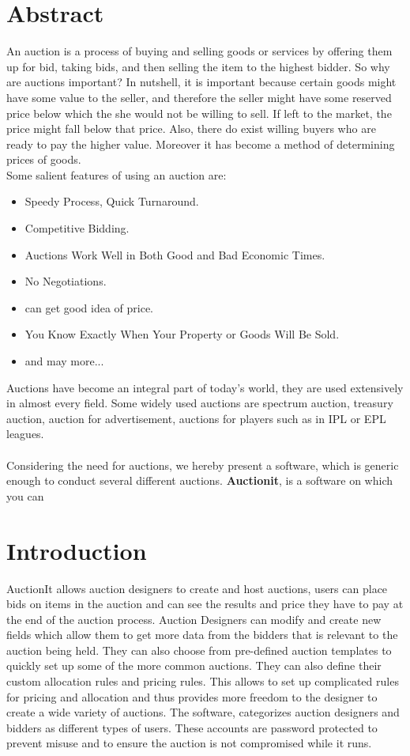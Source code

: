 \documentclass[a4paper]{article}
\begin{document}

\section*{Abstract}
An auction is a process of buying and selling goods or services by offering them up for bid, 
taking bids, and then selling the item to the highest bidder. 
So why are auctions important? In nutshell, it is important because certain goods might have some value to the seller,
and therefore the seller might have some reserved price below which the she would not be willing to sell.
If left to the market, the price might fall below that price.
Also, there do exist willing buyers who are ready to pay the higher value.
Moreover it has become a method of determining prices of goods. \\
Some salient features of using an auction are:
\begin{itemize}
	\item Speedy Process, Quick Turnaround.
	\item Competitive Bidding.
	\item Auctions Work Well in Both Good and Bad Economic Times.
	\item No Negotiations.
	\item can get good idea of price.
	\item You Know Exactly When Your Property or Goods Will Be Sold.
	\item and may more...
\end{itemize}
Auctions have become an integral part of today's world, they are used extensively in almost every field. Some widely used auctions are spectrum auction, treasury auction, auction for advertisement, auctions for players such as in IPL or EPL leagues.\\ \\
Considering the need for auctions, we hereby present a software, which is generic enough to conduct several different auctions. \textbf{Auctionit}, is a software on which you can 
\\

\section*{Introduction}
AuctionIt allows auction designers to create and host auctions, users can place bids on items in the auction and can see the results and price they have to pay at the end of the auction process. Auction Designers can modify and create new fields which allow them to get more data from the bidders that is relevant to the auction being held. They can also choose from pre-defined auction templates to quickly set up some of the more common auctions. They can also define their custom allocation rules and pricing rules. This allows to set up complicated rules for pricing and allocation and thus provides more freedom to the designer to create a wide variety of auctions. 
The software, categorizes auction designers and bidders as different types of users. These accounts are password protected to prevent misuse and to ensure the auction is not compromised while it runs.
\end{document}
